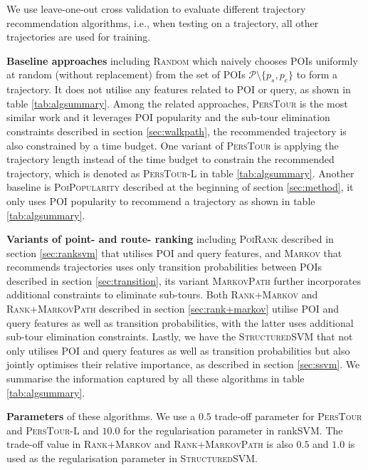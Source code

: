 We use leave-one-out cross validation to evaluate different trajectory recommendation algorithms,
i.e., when testing on a trajectory, all other trajectories are used for training.

{\bf Baseline approaches} including \textsc{Random} which naively chooses POIs uniformly at random
(without replacement) from the set of POIs $\mathcal{P} \setminus \{p_s, p_e \}$ to form a trajectory.
It does not utilise any features related to POI or query, as shown in  table \ref{tab:algsummary}.
Among the related approaches, \textsc{PersTour}\cite{ijcai15} is the most similar work and it
leverages POI popularity and the sub-tour elimination constraints described in section \ref{sec:walkpath},
the recommended trajectory is also constrained by a time budget.
One variant of \textsc{PersTour} is applying the trajectory length instead of the time budget to constrain
the recommended trajectory, which is denoted as \textsc{PersTour-L} in table \ref{tab:algsummary}.
Another baseline is \textsc{PoiPopularity} described at the beginning of section \ref{sec:method},
it only uses POI popularity to recommend a trajectory as shown in table \ref{tab:algsummary}.

{\bf Variants of point- and route- ranking} including \textsc{PoiRank} described in section \ref{sec:ranksvm}
that utilises POI and query features, and \textsc{Markov} that recommends trajectories uses only transition
probabilities between POIs described in section \ref{sec:transition}, its variant \textsc{MarkovPath}
further incorporates additional constraints to eliminate sub-tours.
Both \textsc{Rank+Markov} and \textsc{Rank+MarkovPath} described in section \ref{sec:rank+markov}
utilise POI and query features as well as transition probabilities, with the latter uses
additional sub-tour elimination constraints.
Lastly, we have the \textsc{StructuredSVM} that not only utilises POI and query features as well as
transition probabilities but also jointly optimises their relative importance, as described in section \ref{sec:ssvm}.
We summarise the information captured by all these algorithms in table \ref{tab:algsummary}.

{\bf Parameters} of these algorithms.
We use a $0.5$ trade-off parameter for \textsc{PersTour} and \textsc{PersTour-L}
and $10.0$ for the regularisation parameter in rankSVM.
The trade-off value in \textsc{Rank+Markov} and \textsc{Rank+MarkovPath} is also $0.5$
and $1.0$ is used as the regularisation parameter in \textsc{StructuredSVM}.


